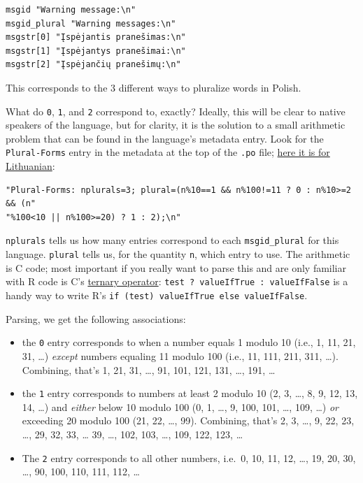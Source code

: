 \documentclass[
]{book}
\providecommand{\tightlist}{%
  \setlength{\itemsep}{0pt}\setlength{\parskip}{0pt}}
\begin{document}
\begin{verbatim}
msgid "Warning message:\n"
msgid_plural "Warning messages:\n"
msgstr[0] "Įspėjantis pranešimas:\n"
msgstr[1] "Įspėjantys pranešimai:\n"
msgstr[2] "Įspėjančių pranešimų:\n"
\end{verbatim}

This corresponds to the 3 different ways to pluralize words in Polish.

What do \texttt{0}, \texttt{1}, and \texttt{2} correspond to, exactly? Ideally, this will be clear to native speakers of the language, but for
clarity, it is the solution to a small arithmetic problem that can be found in the language's metadata entry. Look for the
\texttt{Plural-Forms} entry in the metadata at the top of the \texttt{.po} file;
\href{https://github.com/r-devel/r-svn/blob/c715d61cb74b3fee2d035faed9b258e86e420b75/src/library/base/po/R-lt.po\#L18-L19}{here it is for Lithuanian}:

\begin{verbatim}
"Plural-Forms: nplurals=3; plural=(n%10==1 && n%100!=11 ? 0 : n%10>=2 && (n"
"%100<10 || n%100>=20) ? 1 : 2);\n"
\end{verbatim}

\texttt{nplurals} tells us how many entries correspond to each \texttt{msgid\_plural} for this language. \texttt{plural} tells us, for the
quantity \texttt{n}, which entry to use. The arithmetic is C code; most important if you really want to parse this and are only
familiar with R code is C's \href{https://en.wikipedia.org/wiki/\%3F:}{ternary operator}: \texttt{test\ ?\ valueIfTrue\ :\ valueIfFalse}
is a handy way to write R's \texttt{if\ (test)\ valueIfTrue\ else\ valueIfFalse}.

Parsing, we get the following associations:

\begin{itemize}
\tightlist
\item
  the \texttt{0} entry corresponds to when a number equals 1 modulo 10 (i.e., 1, 11, 21, 31, \ldots) \emph{except} numbers equaling
  11 modulo 100 (i.e., 11, 111, 211, 311, \ldots). Combining, that's 1, 21, 31, \ldots, 91, 101, 121, 131, \ldots, 191, \ldots{}
\item
  the \texttt{1} entry corresponds to numbers at least 2 modulo 10 (2, 3, \ldots, 8, 9, 12, 13, 14, \ldots) and \emph{either}
  below 10 modulo 100 (0, 1, \ldots, 9, 100, 101, \ldots, 109, \ldots) \emph{or} exceeding 20 modulo 100 (21, 22, \ldots, 99). Combining,
  that's 2, 3, \ldots, 9, 22, 23, \ldots, 29, 32, 33, \ldots{} 39, \ldots, 102, 103, \ldots, 109, 122, 123, \ldots{}
\item
  The \texttt{2} entry corresponds to all other numbers, i.e.~0, 10, 11, 12, \ldots, 19, 20, 30, \ldots, 90, 100, 110, 111, 112, \ldots{}
\end{itemize}
\end{document}
